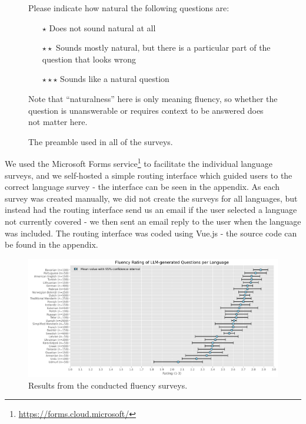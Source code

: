\documentclass[10pt, a4paper]{article}
\begin{document}
\begin{figure}
    \begin{itshape}
        \small
        Please indicate how natural the following questions are:

        \begin{itemize}
            \item[$\star$] Does not sound natural at all
            \item[$\star\star$] Sounds mostly natural, but there is a particular part of the question that looks wrong
            \item[$\star\star\star$] Sounds like a natural question
        \end{itemize}

        Note that ``naturalness'' here is only meaning fluency, so whether the question is unanswerable or requires context to be answered does not matter here.
    \end{itshape}
    \caption{The preamble used in all of the surveys.}
    \label{fig:survey-preamble}
\end{figure}

We used the Microsoft Forms service\footnote{\url{https://forms.cloud.microsoft/}} to facilitate the individual language surveys, and we self-hosted a simple routing interface which guided users to the correct language survey - the interface can be seen in the appendix. As each survey was created manually, we did not create the surveys for all languages, but instead had the routing interface send us an email if the user selected a language not currently covered - we then sent an email reply to the user when the language was included. The routing interface was coded using Vue.js \cite{you2025vuejs} - the source code can be found in the appendix.

\begin{figure}[h]
    \centering
    \includegraphics[width=1\linewidth]{fluency-rating-plot.png}
    \caption{Results from the conducted fluency surveys.}
    \label{fig:quality-evaluation-scores}
\end{figure}
\end{document}
